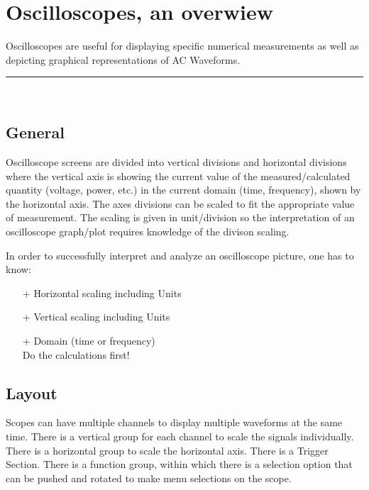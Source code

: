 \documentclass[a4paper, 12pt]{article}
\newcommand{\holine}{
  \noindent\rule{\textwidth}{0.618pt}\\[0.021286\paperheight]
}
\newcommand{\notebox}[1]{

 \begin{center}
  \begin{tcolorbox}[]
   #1 
  \end{tcolorbox}
 
 \end{center} 
 
}
\begin{document}
\section*{Oscilloscopes, an overwiew}

Oscilloscopes are useful for displaying specific numerical measurements as
well as depicting graphical representations of AC Waveforms.\\
  
\holine 

\subsection*{ General }

Oscilloscope screens are divided into vertical divisions and horizontal
divisions where the vertical axis is showing the current value of the
measured/calculated quantity (voltage, power, etc.) in the current domain (time,
frequency), shown by the horizontal axis. The axes divisions can be scaled to fit the appropriate value of
measurement. The scaling is given in unit/division so the
interpretation of an oscilloscope graph/plot requires knowledge of the divison scaling. 

\notebox{

  In order to successfully interpret and analyze an oscilloscope picture, one has to know:\\
  \begin{itemize}
    \item[+]{Horizontal scaling including Units}
    \item[+]{Vertical scaling including Units}
    \item[+]{Domain (time or frequency)}\\

    \small{Do the calculations first!}
  \end{itemize}
}

\subsection*{ Layout }

Scopes can have multiple channels to display multiple waveforms at the same
time. There is a vertical group for each channel to scale the signals
individually. There is a horizontal group to scale the horizontal axis. There is
a Trigger Section. There is a function group, within which there is a selection option that can be pushed and rotated to
make menu selections on the scope.\\
\end{document}
